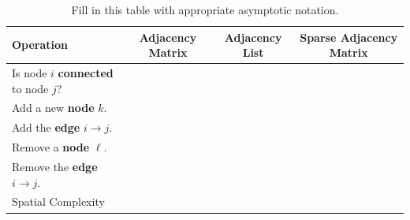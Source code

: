 \documentclass[letterpaper,12pt]{article}
\begin{document}
\begin{table}[H]
	\centering
	\renewcommand*{\arraystretch}{2.0}
	\begin{tabular}{|p{4.5cm}|c|c|c|} \hline
		\textbf{Operation} & \textbf{Adjacency Matrix} & \textbf{Adjacency List} & \textbf{Sparse Adjacency Matrix} \\ \hline
		Is node $i$ \textbf{connected} to node $j$? & & & \\ \hline
		Add a new \textbf{node} $k$. & & & \\ \hline
		Add the \textbf{edge} $i \rightarrow j$. & & & \\  \hline
		Remove a \textbf{node} $\ell$. & & & \\ \hline
		Remove the \textbf{edge} $i \rightarrow j$.  & & & \\ \hline
		Spatial Complexity & & & \\  \hline
	\end{tabular}
	\caption{Fill in this table with appropriate asymptotic notation.}
	\label{tbl:complexities}
\end{table}		

\vspace{.8in}
\end{document}

